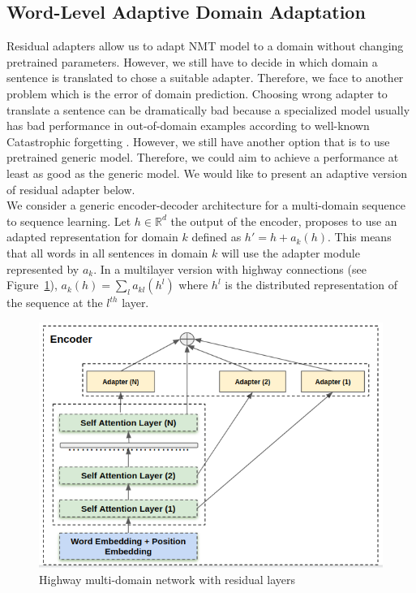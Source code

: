 \documentclass[11pt,a4paper]{article}
\newcommand{\R}{\ensuremath{\mathbb{R}}}
\newcommand{\mpTodo}[1]{\Todo[MP:]{\textcolor{green}{#1}}}
\begin{document}
\subsection{Word-Level Adaptive Domain Adaptation \label{ssec:wada}}
\mpTodo{Formalizing problem, network design, training algorithm}
Residual adapters allow us to adapt NMT model to a domain without changing pretrained parameters. However, we still have to decide in which domain a sentence is translated to chose a suitable adapter. Therefore, we face to another problem which is the error of domain prediction. Choosing wrong adapter to translate a sentence can be dramatically bad because a specialized model usually has bad performance in out-of-domain examples according to well-known Catastrophic forgetting \cite{McCloskey89catastrophic}. However, we still have another option that is to use pretrained generic model. Therefore, we could aim to achieve a performance at least as good as the generic model. We would like to present an adaptive version of residual adapter below.
\\
We consider a generic encoder-decoder architecture for a multi-domain sequence to sequence learning. Let $h \in \R^d$ the output of the encoder, \cite{bapna19simple} proposes to use an adapted representation for domain $k$ defined as $h' = h + a_k(h)$. This means that all words in all sentences in domain $k$ will use the adapter module represented by $a_k$. In a multilayer version with highway connections (see Figure~\ref{fig:hrl-architecture}), $a_k(h) = \sum_{l} a_{kl}(h^l)$ where $h^l$ is the distributed representation of the sequence at the $l^{th}$ layer.
\begin{figure}[h!]
  \centering
  \includegraphics[scale=0.3]{fig/highway_residual}
  \caption{Highway multi-domain network with residual layers}
\label{fig:hrl-architecture}
\end{figure}
\end{document}

